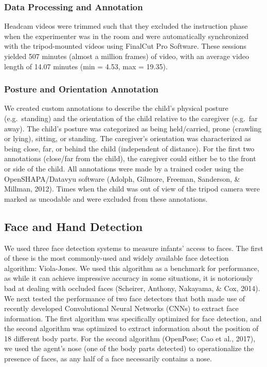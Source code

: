 \documentclass[english,man,floatsintext]{apa6}
\begin{document}
\subsubsection{Data Processing and
Annotation}\label{data-processing-and-annotation}

Headcam videos were trimmed such that they excluded the instruction
phase when the experimenter was in the room and were automatically
synchronized with the tripod-mounted videos using FinalCut Pro Software.
These sessions yielded 507 minutes (almost a million frames) of video,
with an average video length of 14.07 minutes (min = 4.53, max = 19.35).

\subsubsection{Posture and Orientation
Annotation}\label{posture-and-orientation-annotation}

We created custom annotations to describe the child's physical posture
(e.g.~standing) and the orientation of the child relative to the
caregiver (e.g.~far away). The child's posture was categorized as being
held/carried, prone (crawling or lying), sitting, or standing. The
caregiver's orientation was characterized as being close, far, or behind
the child (independent of distance). For the first two annotations
(close/far from the child), the caregiver could either be to the front
or side of the child. All annotations were made by a trained coder using
the OpenSHAPA/Datavyu software (Adolph, Gilmore, Freeman, Sanderson, \&
Millman, 2012). Times when the child was out of view of the tripod
camera were marked as uncodable and were excluded from these
annotations.

\subsection{Face and Hand Detection}\label{face-and-hand-detection}

We used three face detection systems to measure infants' access to
faces. The first of these is the most commonly-used and widely available
face detection algorithm: Viola-Jones. We used this algorithm as a
benchmark for performance, as while it can achieve impressive accuracy
in some situations, it is notoriously bad at dealing with occluded faces
(Scheirer, Anthony, Nakayama, \& Cox, 2014). We next tested the
performance of two face detectors that both made use of recently
developed Convolutional Neural Networks (CNNs) to extract face
information. The first algorithm was specifically optimized for face
detection, and the second algorithm was optimized to extract information
about the position of 18 different body parts. For the second algorithm
(OpenPose; Cao et al., 2017), we used the agent's nose (one of the body
parts detected) to operationalize the presence of faces, as any half of
a face necessarily contains a nose.
\end{document}
